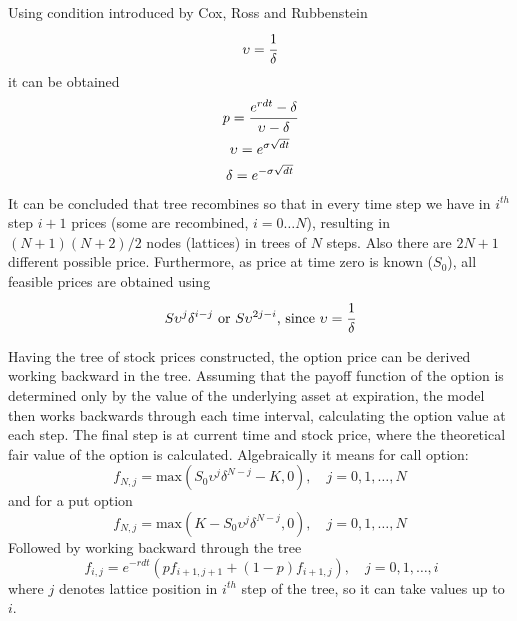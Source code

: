 \noindent
Using condition introduced by Cox, Ross and Rubbenstein
\begin{equation}
\upsilon = \cfrac{1}{\delta}
\end{equation}
it can be obtained
\begin{equation}
\begin{gathered}
p=\cfrac{e^{rdt}-\delta}{\upsilon-\delta}\\
\upsilon = e^{\sigma\sqrt{dt}} \\
\delta = e^{-\sigma\sqrt{dt}}
\end{gathered}
\end{equation}
It can be concluded that tree recombines so that in every time step we have in $i^{th}$ step $i+1$ prices (some are recombined, $i=0\ldots N$), resulting in $(N+1)(N+2)/2$ nodes (lattices) in trees of $N$ steps. Also there are $2N+1$ different possible price. Furthermore, as price at time zero is known ($S_0$), all feasible prices are obtained using
\begin{equation}
S\upsilon^j \delta^{i-j}\textrm{ or }S\upsilon^{2j-i}\textrm{, since }\upsilon=\cfrac{1}{\delta}
\end{equation}

Having the tree of stock prices constructed, the option price can be derived working backward in the tree. %
Assuming that the payoff function of the option is determined only by the value of the underlying asset at expiration, the model then works backwards through each time interval, calculating the option value at each step. The final step is at current time and stock price, where the theoretical fair value of the option is calculated. Algebraically it means for call option:
\begin{equation}
f_{N,j} = \textrm{max}(S_0 \upsilon^{j} \delta^{N-j} - K, 0),\quad j=0,1,\ldots , N
\end{equation}
\noindent
and for a put option
\begin{equation}
f_{N,j} = \textrm{max}(K - S_0 \upsilon^{j} \delta^{N-j}, 0),\quad j=0,1,\ldots , N
\end{equation}
Followed by working backward through the tree
\begin{equation}\
f_{i,j} = e^{-rdt}\left(pf_{i+1,j+1} + (1-p)f_{i+1,j}\right),\quad j=0,1,\ldots , i
\end{equation}
where $j$ denotes lattice position in $i^{th}$ step of the tree, so it can take values up to $i$.

